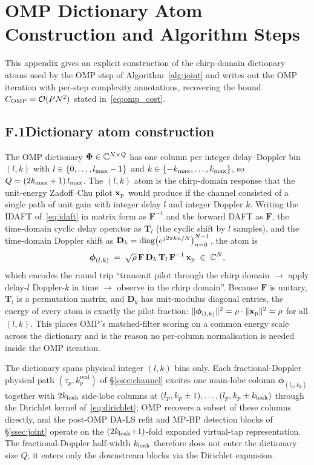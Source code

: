 \section{OMP Dictionary Atom Construction and Algorithm Steps}
\label{app:omp}

This appendix gives an explicit construction of the chirp-domain dictionary atoms used by the OMP step of Algorithm~\ref{alg:joint} and writes out the OMP iteration with per-step complexity annotations, recovering the bound $C_\text{OMP} = \mathcal{O}(P N^2)$ stated in~\eqref{eq:omp_cost}.

\subsection*{F.1\quad Dictionary atom construction}

The OMP dictionary $\boldsymbol{\Phi} \in \mathbb{C}^{N \times Q}$ has one column per integer delay--Doppler bin $(l, k)$ with $l \in \{0, \dots, l_{\max} - 1\}$ and $k \in \{-k_{\max}, \dots, k_{\max}\}$, so $Q = (2k_{\max} + 1)\,l_{\max}$. The $(l, k)$ atom is the chirp-domain response that the unit-energy Zadoff--Chu pilot $\mathbf{x}_{\mathrm{p}}$ would produce if the channel consisted of a single path of unit gain with integer delay $l$ and integer Doppler $k$. Writing the IDAFT of~\eqref{eq:idaft} in matrix form as $\mathbf{F}^{-1}$ and the forward DAFT as $\mathbf{F}$, the time-domain cyclic delay operator as $\mathbf{T}_l$ (the cyclic shift by $l$ samples), and the time-domain Doppler shift as $\mathbf{D}_k = \mathrm{diag}\bigl(e^{j 2\pi k n / N}\bigr)_{n=0}^{N-1}$, the atom is
\begin{equation}
\boldsymbol{\phi}_{(l,k)} \;=\; \sqrt{\rho}\, \mathbf{F}\, \mathbf{D}_k\, \mathbf{T}_l\, \mathbf{F}^{-1}\, \mathbf{x}_{\mathrm{p}} \;\in\; \mathbb{C}^{N}, \label{eq:atom_construction}
\end{equation}
which encodes the round trip ``transmit pilot through the chirp domain $\to$ apply delay-$l$ Doppler-$k$ in time $\to$ observe in the chirp domain''. Because $\mathbf{F}$ is unitary, $\mathbf{T}_l$ is a permutation matrix, and $\mathbf{D}_k$ has unit-modulus diagonal entries, the energy of every atom is exactly the pilot fraction: $\|\boldsymbol{\phi}_{(l,k)}\|^2 = \rho \cdot \|\mathbf{x}_{\mathrm{p}}\|^2 = \rho$ for all $(l, k)$. This places OMP's matched-filter scoring on a common energy scale across the dictionary and is the reason no per-column normalisation is needed inside the OMP iteration.

The dictionary spans physical integer $(l, k)$ bins only. Each fractional-Doppler physical path $(\tau_p, k_p^\text{real})$ of \S\ref{ssec:channel} excites one main-lobe column $\boldsymbol{\phi}_{(l_p, k_p)}$ together with $2k_{\mathrm{leak}}$ side-lobe columns at $(l_p, k_p \pm 1), \dots, (l_p, k_p \pm k_{\mathrm{leak}})$ through the Dirichlet kernel of~\eqref{eq:dirichlet}; OMP recovers a subset of these columns directly, and the post-OMP DA-LS refit and MP-BP detection blocks of \S\ref{ssec:joint} operate on the $(2k_{\mathrm{leak}}{+}1)$-fold expanded virtual-tap representation. The fractional-Doppler half-width $k_{\mathrm{leak}}$ therefore does not enter the dictionary size $Q$; it enters only the downstream blocks via the Dirichlet expansion.

